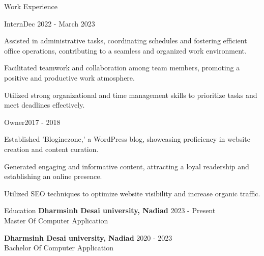 \documentclass{resume} %
\begin{document}
    \begin{rSection}{Work Experience}
                    \begin{rSubsection}
                {Intern}{Dec 2022 - March 2023}
                                    {}
                                {\normalfont{\textit{}}}
                                    \item Assisted in administrative tasks, coordinating schedules and fostering efficient office operations, contributing to a seamless and organized work environment.
                                    \item Facilitated teamwork and collaboration among team members, promoting a positive and productive work atmosphere.
                                    \item Utilized strong organizational and time management skills to prioritize tasks and meet deadlines effectively.
                            \end{rSubsection}
                    \begin{rSubsection}
                {Owner}{2017 - 2018}
                                    {}
                                {\normalfont{\textit{}}}
                                    \item Established 'Bloginezone,' a WordPress blog, showcasing proficiency in website creation and content curation.
                                    \item Generated engaging and informative content, attracting a loyal readership and establishing an online presence.
                                    \item Utilized SEO techniques to optimize website visibility and increase organic traffic.
                            \end{rSubsection}
            \end{rSection}

\begin{rSection}{Education}
                        \textbf{Dharmsinh Desai university, Nadiad} \hfill {2023 - Present} \\
                            {Master Of Computer Application}
                         
             
         
                        \textbf{Dharmsinh Desai university, Nadiad} \hfill {2020 - 2023} \\
                            {Bachelor Of Computer Application}
                         
             
         
    \end{rSection}
\end{document}
